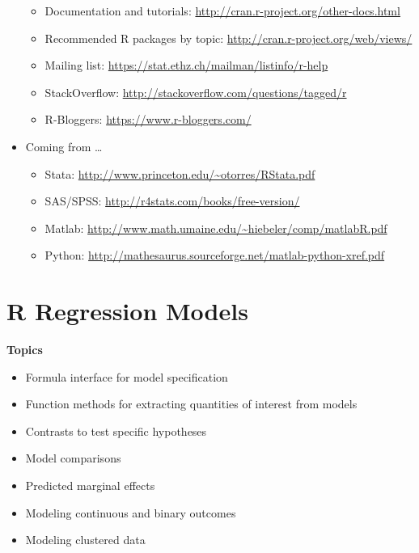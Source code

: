 \documentclass[
]{book}
\providecommand{\tightlist}{%
  \setlength{\itemsep}{0pt}\setlength{\parskip}{0pt}}
\begin{document}
\begin{itemize}
  \begin{itemize}
  \tightlist
  \item
    Documentation and tutorials: \url{http://cran.r-project.org/other-docs.html}
  \item
    Recommended R packages by topic: \url{http://cran.r-project.org/web/views/}
  \item
    Mailing list: \url{https://stat.ethz.ch/mailman/listinfo/r-help}
  \item
    StackOverflow: \url{http://stackoverflow.com/questions/tagged/r}
  \item
    R-Bloggers: \url{https://www.r-bloggers.com/}
  \end{itemize}
\item
  Coming from \ldots{}

  \begin{itemize}
  \tightlist
  \item
    Stata: \url{http://www.princeton.edu/~otorres/RStata.pdf}
  \item
    SAS/SPSS: \url{http://r4stats.com/books/free-version/}
  \item
    Matlab: \url{http://www.math.umaine.edu/~hiebeler/comp/matlabR.pdf}
  \item
    Python: \url{http://mathesaurus.sourceforge.net/matlab-python-xref.pdf}
  \end{itemize}
\end{itemize}

\hypertarget{r-regression-models}{%
\chapter{R Regression Models}\label{r-regression-models}}

\textbf{Topics}

\begin{itemize}
\tightlist
\item
  Formula interface for model specification
\item
  Function methods for extracting quantities of interest from models
\item
  Contrasts to test specific hypotheses
\item
  Model comparisons
\item
  Predicted marginal effects
\item
  Modeling continuous and binary outcomes
\item
  Modeling clustered data
\end{itemize}
\end{document}
